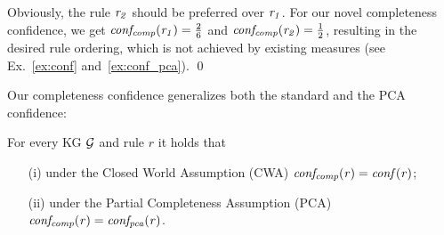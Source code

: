 \begin{example}\label{ex:fam_grad}
\label{ex:conf_comp}
Obviously, the rule $\mathit{r_2}$ %
should be preferred over $\mathit{r_1}$. For our novel %
completeness confidence, we get %
$\mathit{conf_{comp}(r_1)}=\frac{2}{6}$ %
and $\mathit{conf_{comp}(r_2)}=\frac{1}{2}$, resulting in the desired rule ordering,  which is not achieved by %
existing measures %
(see Ex.~\ref{ex:conf} and~\ref{ex:conf_pca}).
\qed




\end{example}

Our completeness confidence generalizes both 
the standard %
and the PCA confidence:

\begin{proposition}
For every KG $\mathcal{G}$ and rule $r$ it holds that 
\begin{itemize}
\item[(i)] under the Closed World Assumption (CWA) $\mathit{conf_{comp}(r)=conf(r)}$;
\item[(ii)] under the Partial Completeness Assumption (PCA) $\mathit{conf_{comp}(r)=conf_{pca}(r)}$.
\end{itemize}
\end{proposition}

